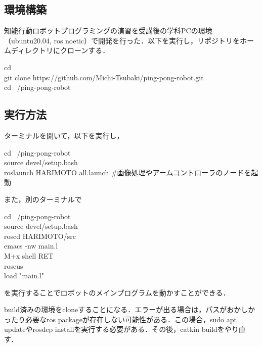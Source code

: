 \documentclass[10pt, oneside, titlepage]{ltjarticle}  %
\begin{document}
\subsection{環境構築}
知能行動ロボットプログラミングの演習を受講後の学科PCの環境（ubuntu20.04, ros noetic）で開発を行った．以下を実行し，リポジトリをホームディレクトリにクローンする．
\begin{screen}
  cd ~ \\
  git clone https://github.com/Michi-Tsubaki/ping-pong-robot.git \\
  cd ~/ping-pong-robot \\
\end{screen}
\subsection{実行方法}
ターミナルを開いて，以下を実行し，
\begin{screen}
  cd ~/ping-pong-robot \\
  source devel/setup.bash \\
  roslaunch HARIMOTO all.launch \#画像処理やアームコントローラのノードを起動
\end{screen}
また，別のターミナルで
\begin{screen}
cd ~/ping-pong-robot\\
source devel/setup.bash \\
roscd HARIMOTO/src \\
emacs -nw main.l \\
M+x shell RET\\
roseus \\
load "main.l"
\end{screen}
を実行することでロボットのメインプログラムを動かすことができる．

build済みの環境をcloneすることになる．エラーが出る場合は，パスがおかしかったり必要なros packageが存在しない可能性がある．この場合，sudo apt updateやrosdep installを実行する必要がある．その後，catkin buildをやり直す．
\end{document}
